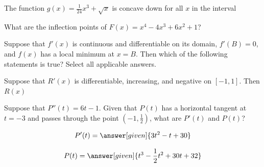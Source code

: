 \documentclass[handout]{ximera}
\begin{document}
\begin{problem}
The function $\displaystyle g(x) = \frac{1}{24}x^3+\sqrt{x}$ is concave down for all $x$ in the interval
\begin{multipleChoice}
\end{multipleChoice}
\end{problem}


\begin{problem}
What are the inflection points of $F(x)=x^4-4x^3+6x^2+1$?
\begin{multipleChoice}
\end{multipleChoice}
\end{problem}


\begin{problem}
Suppose that $f'(x)$ is continuous and differentiable on its domain, $f'(B)=0$, and $f(x)$ has a local minimum at $x=B$. Then which of the following statements is true? Select all applicable answers.
\begin{selectAll}
\end{selectAll}
\end{problem}


\begin{problem}
Suppose that $R'(x)$ is differentiable, increasing, and negative on $[-1,1]$. Then $R(x)$


\begin{multipleChoice}
\end{multipleChoice}
\end{problem}


\begin{problem}
Suppose that $P''(t)=6t-1$. Given that $P(t)$ has a horizontal tangent at $t=-3$ and passes through the point $(-1,\frac{1}{2})$, what are $P'(t)$ and $P(t)$?
\begin{question}
	\[
	\displaystyle P'(t) =    \answer[given]{3t^{2}-t+30 }
	\]
\end{question}

\begin{question}
	\[
	\displaystyle P(t) =    \answer[given]{t^{3}-\frac{1}{2}t^{2}+30t+ 32}
	\]
\end{question}
\end{problem}
\end{document}
